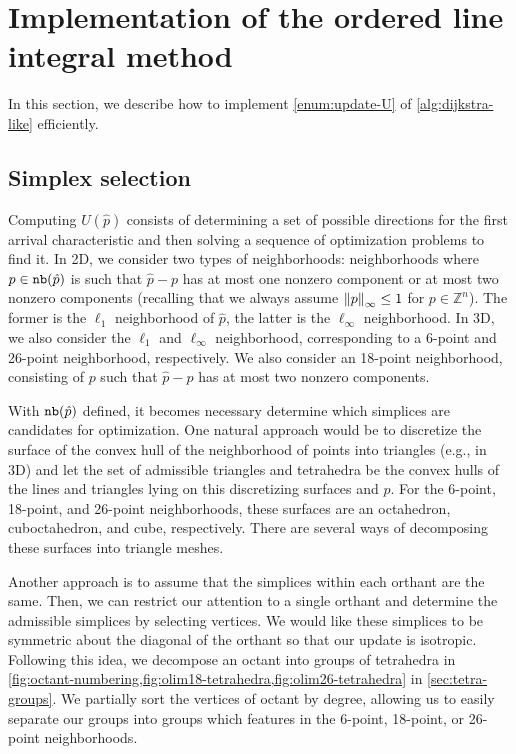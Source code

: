 \documentclass[eikonal.tex]{subfiles}
\begin{document}
\section{Implementation of the ordered line integral
  method}\label{sec:implementation}

In this section, we describe how to implement \cref{enum:update-U} of
\cref{alg:dijkstra-like} efficiently.

\subsection{Simplex selection}

Computing $U(\hat{p})$ consists of determining a set of possible
directions for the first arrival characteristic and then solving a
sequence of optimization problems to find it. In 2D, we consider two
types of neighborhoods: neighborhoods where $p \in \texttt{nb}(\hat{p})$ is
such that $\hat{p} - p$ has at most one nonzero component or at most
two nonzero components (recalling that we always assume
$\left\|p\right\|_\infty \leq 1$ for $p \in \mathbb{Z}^n$). The former is the
$\ell_1$ neighborhood of $\hat{p}$, the latter is the $\ell_\infty$
neighborhood. In 3D, we also consider the $\ell_1$ and $\ell_\infty$
neighborhood, corresponding to a 6-point and 26-point neighborhood,
respectively. We also consider an 18-point neighborhood, consisting of
$p$ such that $\hat{p} - p$ has at most two nonzero components.

With $\texttt{nb}(\hat{p})$ defined, it becomes necessary determine which
simplices are candidates for optimization. One natural approach would
be to discretize the surface of the convex hull of the neighborhood of
points into triangles (e.g., in 3D) and let the set of admissible
triangles and tetrahedra be the convex hulls of the lines and
triangles lying on this discretizing surfaces and $\hat{p}$. For the
6-point, 18-point, and 26-point neighborhoods, these surfaces are an
octahedron, cuboctahedron, and cube, respectively. There are several
ways of decomposing these surfaces into triangle meshes.

Another approach is to assume that the simplices within each orthant
are the same. Then, we can restrict our attention to a single orthant
and determine the admissible simplices by selecting vertices. We would
like these simplices to be symmetric about the diagonal of the orthant
so that our update is isotropic. Following this idea, we decompose an
octant into groups of tetrahedra in
\cref{fig:octant-numbering,fig:olim18-tetrahedra,fig:olim26-tetrahedra}
in \cref{sec:tetra-groups}. We partially sort the vertices of octant
by degree, allowing us to easily separate our groups into groups which
features in the 6-point, 18-point, or 26-point neighborhoods.
\end{document}
